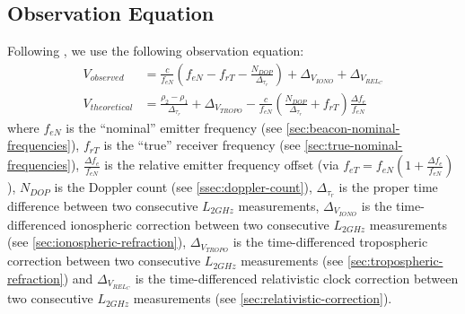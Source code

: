 \subsection{Observation Equation}
\label{ssec:observation-equation}
Following \cite{lemoine-2016}, we use the following observation equation:
\begin{equation}
  \begin{aligned}
    V_{observed} &= \frac{c}{f_{eN}} 
      \left( f_{eN} - f_{rT} - \frac{N_{DOP}}{\Delta _{\tau_r}} \right)
      + \Delta _{V_{IONO}} + \Delta _{V_{REL_C}} \\
    V_{theoretical} &= \frac{\rho_2 - \rho_1}{\Delta _{\tau_r}} + \Delta _{V_{TROPO}} 
      - \frac{c}{f_{eN}} \left( \frac{N_{DOP}}{\Delta _{\tau_r}} + f_{rT} \right) 
      \frac{\Delta f_e}{f_{eN}}
  \end{aligned}
\end{equation}
where $f_{eN}$ is the ``nominal'' emitter frequency (see \ref{sec:beacon-nominal-frequencies}), 
$f_{rT}$ is the ``true'' receiver frequency (see \ref{sec:true-nominal-frequencies}), 
$\frac{\Delta f_e}{f_{eN}}$ is the relative emitter frequency offset  
(via $f_{eT} = f_{eN} \left( 1 + \frac{\Delta f_e}{f_{eN}} \right)$), 
$N_{DOP}$ is the Doppler count (see \ref{ssec:doppler-count}), $\Delta _{\tau_r}$ 
is the proper time difference between two consecutive $L_{2GHz}$ measurements, 
$\Delta _{V_{IONO}}$ is the time-differenced ionospheric correction between two 
consecutive $L_{2GHz}$ measurements (see \ref{sec:ionospheric-refraction}), 
$\Delta _{V_{TROPO}}$ is the time-differenced tropospheric correction between 
two consecutive $L_{2GHz}$ measurements (see \ref{sec:tropospheric-refraction}) 
and $\Delta _{V_{REL_C}}$ is the time-differenced relativistic clock correction 
between two consecutive $L_{2GHz}$ measurements (see \ref{sec:relativistic-correction}).

%

